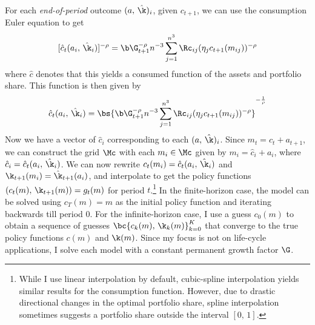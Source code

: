 For each \textit{end-of-period} outcome $(a,\,\hat{\k})_i$, given $c_{t+1}$, we can use the consumption Euler equation to get
\[
[\hat{c}_t(a_i,\,\hat{\k}_i)]^{-\rho} = \b\G_{t+1}^{-\rho} n^{-3}\sum_{j=1}^{n^3}\Rc_{ij}(\eta_{j}c_{t+1}(m_{ij}))^{-\rho}
\]
where $\hat{c}$ denotes that this yields a consumed function of the assets and portfolio share.
This function is then given by
\[
\hat{c}_{t}(a_i,\,\hat{\k}_i) = \bs{\b\G_{t+1}^{-\rho}n^{-3}\sum_{j=1}^{n^3}\Rc_{ij}(\eta_{j}c_{t+1}(m_{ij}))^{-\rho}}^{-\frac{1}{\rho}}
\]
Now we have a vector of $\hat{c}_i$ corresponding to each $(a,\,\hat{\k})_i$. Since $m_{t} = c_{t} + a_{t+1}$, we can construct the grid $\Mc$ with each $m_i \in \Mc$ given by $m_i = \hat{c}_i + a_i$, where $\hat{c}_{i} = \hat{c}_{t}(a_i,\,\hat{\k}_i)$. We can now rewrite $c_t(m_i) = \hat{c}_t(a_i,\,\hat{\k}_i)$ and $\k_{t+1}(m_i) = \hat{\k}_{t+1}(a_i)$, and interpolate to get the policy functions $(c_{t}(m),\,\k_{t+1}(m)) = g_{t}(m)$ for period $t$.\footnote{While I use linear interpolation by default, cubic-spline interpolation yields similar results for the consumption function. However, due to drastic directional changes in the optimal portfolio share, spline interpolation sometimes suggests a portfolio share outside the interval $[0,\,1]$.} In the finite-horizon case, the model can be solved using $c_{T}(m) = m$ as the initial policy function and iterating backwards till period 0. For the infinite-horizon case, I use a guess $c_{0}(m)$ to obtain a sequence of guesses $\bc{c_{k}(m),\,\k_{k}(m)}_{k=0}^{K}$ that converge to the true policy functions $c(m)$ and $\k(m)$. Since my focus is not on life-cycle applications, I solve each model with a constant permanent growth factor $\G$.



